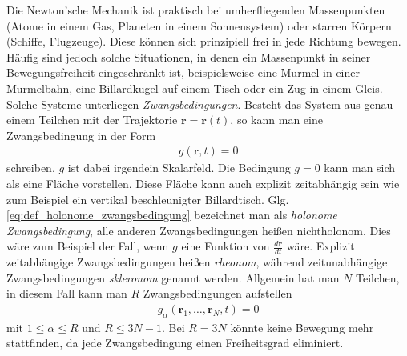 \documentclass{book}
\begin{document}
Die Newton'sche Mechanik ist praktisch bei umherfliegenden Massenpunkten (Atome in einem Gas, Planeten in einem Sonnensystem) oder starren Körpern (Schiffe, Flugzeuge). Diese können sich prinzipiell frei in jede Richtung bewegen. Häufig sind jedoch solche Situationen, in denen ein Massenpunkt in seiner Bewegungsfreiheit eingeschränkt ist, beispielsweise eine Murmel in einer Murmelbahn, eine Billardkugel auf einem Tisch oder ein Zug in einem Gleis. Solche Systeme unterliegen \textit{Zwangsbedingungen}. Besteht das System aus genau einem Teilchen mit der Trajektorie $\mathbf{r} = \mathbf{r}\left(t\right)$, so kann man eine Zwangsbedingung in der Form
%
\begin{eqnarray}
g\left(\mathbf{r}, t\right) = 0\label{eq:def_holonome_zwangsbedingung}
\end{eqnarray}
%
schreiben. $g$ ist dabei irgendein Skalarfeld. Die Bedingung $g = 0$ kann man sich als eine Fläche vorstellen. Diese Fläche kann auch explizit zeitabhängig sein wie zum Beispiel ein vertikal beschleunigter Billardtisch. Glg. \eqref{eq:def_holonome_zwangsbedingung} bezeichnet man als \textit{holonome Zwangsbedingung},  alle anderen Zwangsbedingungen heißen nichtholonom. Dies wäre zum Beispiel der Fall, wenn $g$ eine Funktion von $\frac{d\mathbf{r}}{dt}$ wäre. Explizit zeitabhängige Zwangsbedingungen heißen \textit{rheonom}, während zeitunabhängige Zwangsbedingungen \textit{skleronom} genannt werden. Allgemein hat man $N$ Teilchen, in diesem Fall kann man $R$ Zwangsbedingungen aufstellen
%
\begin{eqnarray}
g_\alpha\left(\mathbf{r}_1, \dotsc, \mathbf{r}_N, t\right) = 0
\end{eqnarray}
%
mit $1\leq\alpha\leq R$ und $R\leq 3N - 1$. Bei $R = 3N$ könnte keine Bewegung mehr stattfinden, da jede Zwangsbedingung einen Freiheitsgrad eliminiert.
\end{document}
